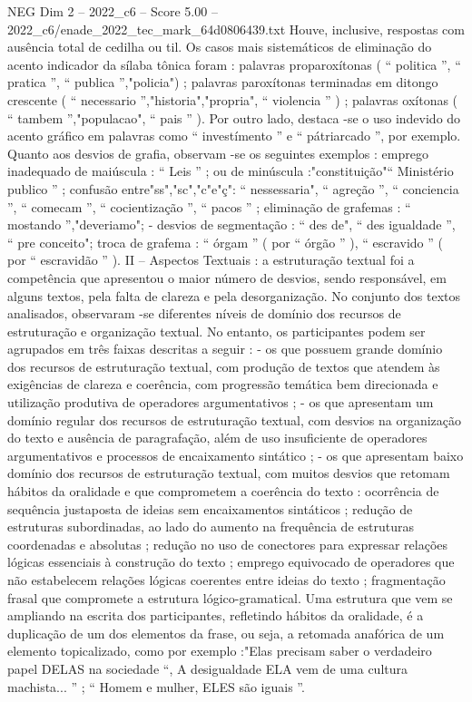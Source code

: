\begin{textsample}{NEG Dim 2 – 2022\_c6 – Score 5.00 – 2022\_c6/enade\_2022\_tec\_mark\_64d0806439.txt}
Houve, inclusive, respostas com ausência total de cedilha ou til.
Os casos mais sistemáticos de eliminação do acento indicador da sílaba tônica foram : palavras proparoxítonas ( “ politica ”, “ pratica ”, “ publica ”,"policia") ; palavras paroxítonas terminadas em ditongo crescente ( “ necessario ”,"historia","propria", “ violencia ” ) ; palavras oxítonas ( “ tambem ”,"populacao", “ pais ” ).
Por outro lado, destaca -se o uso indevido do acento gráfico em palavras como “ investímento ” e “ pátriarcado ”, por exemplo.
Quanto aos desvios de grafia, observam -se os seguintes exemplos : emprego inadequado de maiúscula : “ Leis ” ; ou de minúscula :"constituição"“ Ministério publico ” ; confusão entre"ss","sc","c"e"ç": “ nessessaria", “ agreção ”, “ conciencia ”, “ comecam ”, “ cocientização ”, “ pacos ” ; eliminação de grafemas : “ mostando ”,"deveriamo"; - desvios de segmentação : “ des de", “ des igualdade ”, “ pre conceito"; troca de grafema : “ órgam ” ( por “ órgão ” ), “ escravido ” ( por “ escravidão ” ).
II – Aspectos Textuais : a estruturação textual foi a competência que apresentou o maior número de desvios, sendo responsável, em alguns textos, pela falta de clareza e pela desorganização.
No conjunto dos textos analisados, observaram -se diferentes níveis de domínio dos recursos de estruturação e organização textual.
No entanto, os participantes podem ser agrupados em três faixas descritas a seguir : - os que possuem grande domínio dos recursos de estruturação textual, com produção de textos que atendem às exigências de clareza e coerência, com progressão temática bem direcionada e utilização produtiva de operadores argumentativos ; - os que apresentam um domínio regular dos recursos de estruturação textual, com desvios na organização do texto e ausência de paragrafação, além de uso insuficiente de operadores argumentativos e processos de encaixamento sintático ; - os que apresentam baixo domínio dos recursos de estruturação textual, com muitos desvios que retomam hábitos da oralidade e que comprometem a coerência do texto : ocorrência de sequência justaposta de ideias sem encaixamentos sintáticos ; redução de estruturas subordinadas, ao lado do aumento na frequência de estruturas coordenadas e absolutas ; redução no uso de conectores para expressar relações lógicas essenciais à construção do texto ; emprego equivocado de operadores que não estabelecem relações lógicas coerentes entre ideias do texto ; fragmentação frasal que compromete a estrutura lógico-gramatical.
Uma estrutura que vem se ampliando na escrita dos participantes, refletindo hábitos da oralidade, é a duplicação de um dos elementos da frase, ou seja, a retomada anafórica de um elemento topicalizado, como por exemplo :"Elas precisam saber o verdadeiro papel DELAS na sociedade “, A desigualdade ELA vem de uma cultura machista... ” ; “ Homem e mulher, ELES são iguais ”.

\end{textsample}
